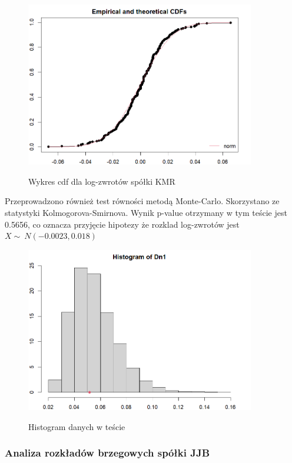 \documentclass[a4paper,11pt]{article}
\begin{document}
\begin{figure}[htb]
	\centering
	\includegraphics[width=10cm]{kmr_cdf_log.png}
        \label{fig:kmr_cdf_log.png}
	\caption{Wykres cdf dla log-zwrotów spółki KMR}
\end{figure}

Przeprowadzono również test równości metodą Monte-Carlo. Skorzystano ze statystyki Kolmogorova-Smirnova. Wynik p-value otrzymany w tym teście jest 0.5656, co oznacza przyjęcie hipotezy że rozklad log-zwrotów jest  $X \sim\ N(-0.0023, 0.018)$

\begin{figure}[htb]
	\centering
	\includegraphics[width=10cm]{kmr_histMC.png}
        \label{fig:kmr_histMC}
	\caption{Histogram danych w teście }
\end{figure}

\subsubsection{Analiza rozkładów brzegowych spółki JJB}
\end{document}
